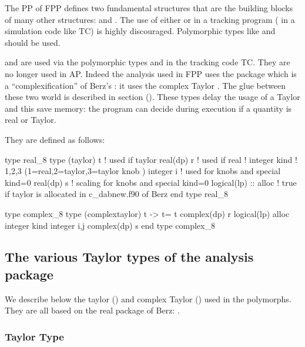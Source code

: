 \documentclass{hitec}     %
\begin{document}
{{The PP of FPP defines two fundamental structures that are the building blocks of many other structures:
 and . The  use of either  or   in a tracking program (
in a  simulation code like  TC) is highly discouraged. Polymorphic types like  and 
should be used.

  and  are used  via the polymorphic types  and  in the tracking code TC. They are no longer used in AP. Indeed the analysis used in FPP uses the package  which is a ``complexification'' of Berz's : it uses the complex Taylor . The glue between these two world is described in section (). These types delay the usage of a Taylor and this save memory: the program can decide during execution if a quantity is real or Taylor.
 


 
 
 They are defined as follows:
 
 \begin{code}
type real_8
 type (taylor) t ! used if taylor
 real(dp) r ! used if real
!
 integer kind !  1,2,3 (1=real,2=taylor,3=taylor knob )
 integer i ! used for knobs and special kind=0
 real(dp) s ! scaling for knobs and special kind=0
 logical(lp) :: alloc ! true if taylor is allocated in c_dabnew.f90 of Berz  
end type real_8

  
type complex_8
 type (complextaylor) t    -> t= t%
 complex(dp) r
 logical(lp) alloc
 integer kind
 integer i,j
 complex(dp) s
end type complex_8
 \end{code}
 
 \subsection{The various Taylor types of the analysis package}
\label{s:taylorall}


We describe below the taylor () and complex Taylor () used in the polymorphs. They  are all based on the real package of Berz: .

\subsubsection{Taylor Type}
\label{s:taylor}

}}
\end{document}
